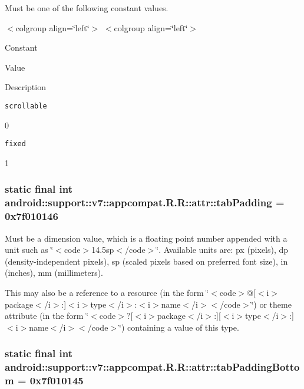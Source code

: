 Must be one of the following constant values. \begin{TabularC}{0}
\hline
\end{TabularC}
$<$colgroup align=\char`\"{}left\char`\"{}$>$ $<$colgroup align=\char`\"{}left\char`\"{}$>$ 

Constant

Value

Description 

{\tt scrollable}

0

{\tt fixed}

1\hypertarget{classandroid_1_1support_1_1v7_1_1appcompat_1_1_r_1_1attr_556aaae13b0f53a2318a4aee478c1bf2}{
\subsubsection[{tabPadding}]{\setlength{\rightskip}{0pt plus 5cm}static final int android::support::v7::appcompat.R.R::attr::tabPadding = 0x7f010146}}
\label{classandroid_1_1support_1_1v7_1_1appcompat_1_1_r_1_1attr_556aaae13b0f53a2318a4aee478c1bf2}


Must be a dimension value, which is a floating point number appended with a unit such as \char`\"{}$<$code$>$14.5sp$<$/code$>$\char`\"{}. Available units are: px (pixels), dp (density-independent pixels), sp (scaled pixels based on preferred font size), in (inches), mm (millimeters). 

This may also be a reference to a resource (in the form \char`\"{}$<$code$>$@\mbox{[}$<$i$>$package$<$/i$>$:\mbox{]}$<$i$>$type$<$/i$>$:$<$i$>$name$<$/i$>$$<$/code$>$\char`\"{}) or theme attribute (in the form \char`\"{}$<$code$>$?\mbox{[}$<$i$>$package$<$/i$>$:\mbox{]}\mbox{[}$<$i$>$type$<$/i$>$:\mbox{]}$<$i$>$name$<$/i$>$$<$/code$>$\char`\"{}) containing a value of this type. \hypertarget{classandroid_1_1support_1_1v7_1_1appcompat_1_1_r_1_1attr_9048f153b6e18a89ee8db966376a60d3}{
\subsubsection[{tabPaddingBottom}]{\setlength{\rightskip}{0pt plus 5cm}static final int android::support::v7::appcompat.R.R::attr::tabPaddingBottom = 0x7f010145}}
\label{classandroid_1_1support_1_1v7_1_1appcompat_1_1_r_1_1attr_9048f153b6e18a89ee8db966376a60d3}


